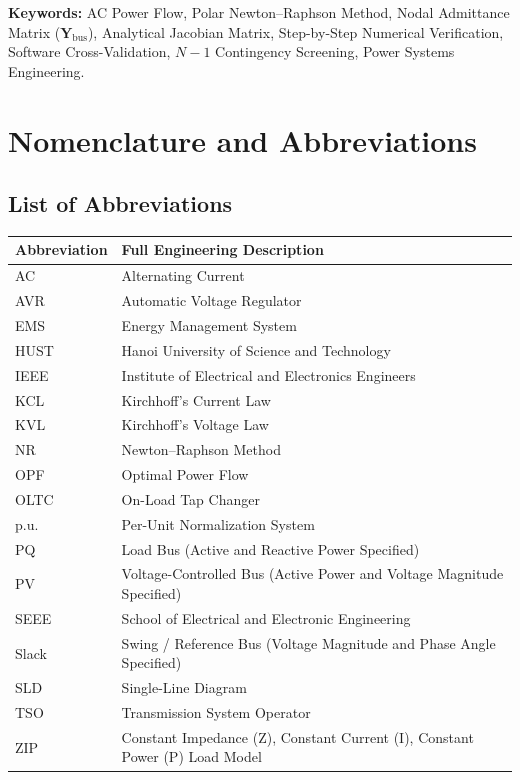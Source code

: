 \documentclass[12pt,a4paper,oneside]{report}
\begin{document}
\vspace{15pt}
\noindent \textbf{Keywords:} AC Power Flow, Polar Newton--Raphson Method, Nodal Admittance Matrix ($\mathbf{Y}_{\text{bus}}$), Analytical Jacobian Matrix, Step-by-Step Numerical Verification, Software Cross-Validation, $N-1$ Contingency Screening, Power Systems Engineering.

\clearpage

\chapter*{Nomenclature and Abbreviations}

\section*{List of Abbreviations}
\begin{longtable}{ll}
\toprule
\textbf{Abbreviation} & \textbf{Full Engineering Description} \\
\midrule
AC & Alternating Current \\
AVR & Automatic Voltage Regulator \\
EMS & Energy Management System \\
HUST & Hanoi University of Science and Technology \\
IEEE & Institute of Electrical and Electronics Engineers \\
KCL & Kirchhoff's Current Law \\
KVL & Kirchhoff's Voltage Law \\
NR & Newton--Raphson Method \\
OPF & Optimal Power Flow \\
OLTC & On-Load Tap Changer \\
p.u. & Per-Unit Normalization System \\
PQ & Load Bus (Active and Reactive Power Specified) \\
PV & Voltage-Controlled Bus (Active Power and Voltage Magnitude Specified) \\
SEEE & School of Electrical and Electronic Engineering \\
Slack & Swing / Reference Bus (Voltage Magnitude and Phase Angle Specified) \\
SLD & Single-Line Diagram \\
TSO & Transmission System Operator \\
ZIP & Constant Impedance (Z), Constant Current (I), Constant Power (P) Load Model \\
\bottomrule
\end{longtable}
\end{document}
